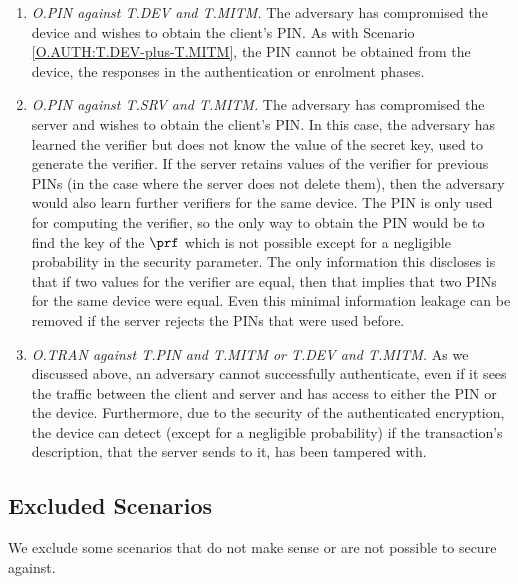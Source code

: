 \documentclass[runningheads]{llncs}
\begin{document}
\begin{enumerate}
\item\textit{O.PIN against T.DEV and  T.MITM.}
The adversary has compromised the device and wishes to obtain the client's PIN. As with Scenario \ref{O.AUTH:T.DEV-plus-T.MITM}, the PIN cannot be obtained from the device, the responses in the authentication or enrolment phases.

\item\textit{O.PIN against T.SRV and T.MITM.}
\label{sec:servercompromise}
The adversary has compromised the server and wishes to obtain the client's PIN.
In this case, the adversary has learned the verifier but does not know the value of the secret key, used to generate the verifier. If the server retains values of the verifier for previous PINs (in the case where the server does not delete them), then the adversary would also learn further verifiers for the same device. The PIN is only used for computing the verifier, so the only way to obtain the PIN would be to find the key of the $\prf$ which is not possible except for a negligible probability in the security parameter. The only information this discloses is that if two values for the verifier are equal, then that implies that two PINs for the same device were equal. Even this minimal information leakage can be removed if the server rejects the PINs that were used before. 

\item\textit{O.TRAN against T.PIN and T.MITM or T.DEV and T.MITM.} As we discussed above, an adversary cannot successfully authenticate, even if it sees the traffic between the client and server and has access to either the PIN or the device. Furthermore, due to the security of the authenticated encryption, the device can detect (except for a negligible probability) if the transaction's description, that the server sends to it, has been tampered with. 
 
\end{enumerate}


\subsection{Excluded Scenarios}

We exclude some scenarios that do not make sense or are not possible to secure against.
\end{document}
